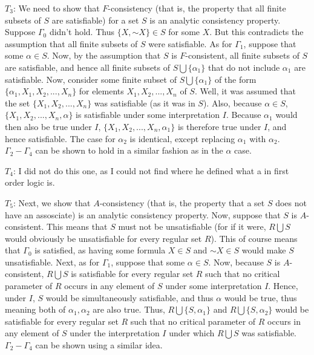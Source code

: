\documentclass{article}
\newcommand*{\oldneg}{\mathord{\sim}}
\theoremstyle{definition}
\begin{document}
$T_3$: We need to show that $F$-consistency (that is, the property that all finite subsets of $S$ are satisfiable) for a set $S$ is an analytic consistency 
property. Suppose $\Gamma_0$ didn't hold. Thus $\{X,\oldneg X\}\in S$ for some $X$. But this contradicts the assumption that all finite subsets of $S$ were 
satisfiable. As for $\Gamma_1$, suppose that some $\alpha\in S$. Now, by the assumption that $S$ is $F$-consistent, all finite subsets of $S$ are 
satisfiable, and hence all finite subsets of $S\bigcup \{\alpha_1\}$ that do not include $\alpha_1$ are satisfiable. Now, consider some finite subset of 
$S\bigcup \{\alpha_1\}$ of the form $\{\alpha_1,X_1,X_2,...,X_n\}$ for elements $X_1,X_2,...,X_n$ of $S$. Well, it was assumed that the set
$\{X_1,X_2,...,X_n\}$ was satisfiable (as it was in $S$). Also, because $\alpha\in S$, $\{X_1,X_2,...,X_n,\alpha\}$ is satisfiable under some interpretation $I$. 
Because $\alpha_1$ would then also be true under $I$, $\{X_1,X_2,...,X_n,\alpha_1\}$ is therefore true under $I$, and hence satisfiable. The case for 
$\alpha_2$ is identical, except replacing $\alpha_1$ with $\alpha_2$. $\Gamma_2-\Gamma_4$ can be shown to hold in a similar fashion as in the $\alpha$ case.

$T_4$: I did not do this one, as I could not find where he defined what a  in first order logic is.


$T_5$: Next, we show that $A$-consistency (that is, the property that a set $S$ does not have an assosciate) is an analytic consistency property. Now, suppose that 
$S$ is $A$-consistent. This means that $S$ must not be unsatisfiable (for if it were, $R\bigcup S$ would obviously be unsatisfiable for every 
regular set $R$). This of course means that $\Gamma_0$ is satisfied, as having some formula $X\in S$ and $\oldneg X\in S$ would make $S$ unsatisfiable. Next, 
as for $\Gamma_1$, suppose that some $\alpha\in S$. Now, because $S$ is $A$-consistent, $R\bigcup S$ is satisfiable for every regular set $R$ such that no critical parameter 
of $R$ occurs in any element of $S$ under some 
interpretation $I$. Hence, under $I$, $S$ would be simultaneously satisfiable, and thus $\alpha$ would be true, thus meaning both of $\alpha_1,\alpha_2$ are 
also true. Thus, $R\bigcup \{S,\alpha_1\}$ and $R\bigcup \{S,\alpha_2\}$ would be satisfiable for every regular set $R$ such that no critical parameter of $R$ occurs in any 
element of $S$ under the interpretation $I$ under 
which $R\bigcup S$ was satisfiable. $\Gamma_2-\Gamma_4$ can be shown using a similar idea.
\end{document}
